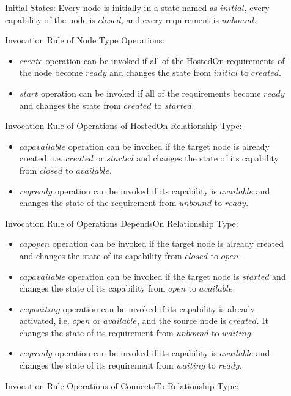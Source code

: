 \documentclass[12pt]{report}
\begin{document}
\begin{description}
\item[]Initial States: Every node is initially in a state named as
  $initial$, every capability of the node is $closed$, and
  every requirement is $unbound$.
\item[] Invocation Rule of Node Type Operations:
  \begin{itemize}
  \item $create$ operation can be invoked if all of the HostedOn
    requirements of the node become $ready$ and changes the state from
    $initial$ to $created$.
  \item $start$ operation can be invoked if all of the requirements
    become $ready$ and changes the state from $created$ to $started$.
  \end{itemize}
\item[] Invocation Rule of Operations of HostedOn Relationship Type:
  \begin{itemize}
  \item $capavailable$ operation can be invoked if the target node is
    already created, i.e. $created$ or $started$ and changes the state
    of its capability from $closed$ to $available$.
  \item $reqready$ operation can be invoked if its capability is
    $available$ and changes the state of the requirement from $unbound$
    to $ready$.
  \end{itemize}
\item[] Invocation Rule of Operations DependsOn Relationship Type:
  \begin{itemize}
  \item $capopen$ operation can be invoked if the target node is
    already created and changes the state of its capability from
    $closed$ to $open$.
  \item $capavailable$ operation can be invoked if the target node is
    $started$ and changes the state of its capability from
    $open$ to $available$.
  \item $reqwaiting$ operation can be invoked if its capability is already
    activated, i.e. $open$ or $available$, and the source node is
    $created$. It changes the state of its requirement from
    $unbound$ to $waiting$.
  \item $reqready$ operation can be invoked if its capability is
    $available$ and changes the state of its requirement from
    $waiting$ to $ready$.
  \end{itemize}
\item[] Invocation Rule Operations of ConnectsTo Relationship Type:

\end{description}
\end{document}
